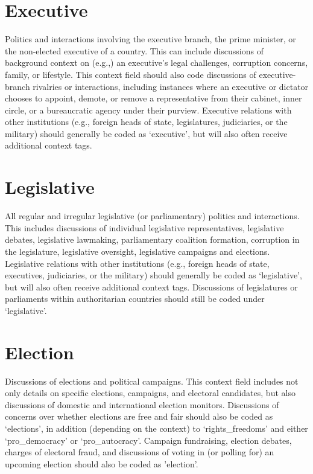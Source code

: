 \documentclass[11pt]{report}
\begin{document}
\section{Executive}\label{context:executive}

Politics and interactions involving the executive branch, the prime minister, or the non-elected executive of a country. This can include discussions of background context on (e.g.,) an executive's legal challenges, corruption concerns, family, or lifestyle. This context field should also code discussions of executive-branch rivalries or interactions, including instances where an executive or dictator chooses to appoint, demote, or remove a representative from their cabinet, inner circle, or a bureaucratic agency under their purview. Executive relations with other institutions (e.g., foreign heads of state, legislatures, judiciaries, or the military) should generally be coded as `executive', but will also often receive additional context tags.

\section{Legislative}\label{context:legislative}

All regular and irregular legislative (or parliamentary) politics and interactions. This includes discussions of individual legislative representatives, legislative debates, legislative lawmaking, parliamentary coalition formation, corruption in the legislature, legislative oversight, legislative campaigns and elections. Legislative relations with other institutions (e.g., foreign heads of state, executives, judiciaries, or the military) should generally be coded as `legislative', but will also often receive additional context tags. Discussions of legislatures or parliaments within authoritarian countries should still be coded under `legislative'.

\section{Election}\label{context:election}
Discussions of elections and political campaigns. This context field includes not only details on specific elections, campaigns, and electoral candidates, but also discussions of domestic and international election monitors. Discussions of concerns over whether elections are free and fair should also be coded as `elections', in addition (depending on the context) to `rights\_freedoms' and either `pro\_democracy' or `pro\_autocracy'. Campaign fundraising, election debates, charges of electoral fraud, and discussions of voting in (or polling for) an upcoming election should also be coded as 'election'.
\end{document}
